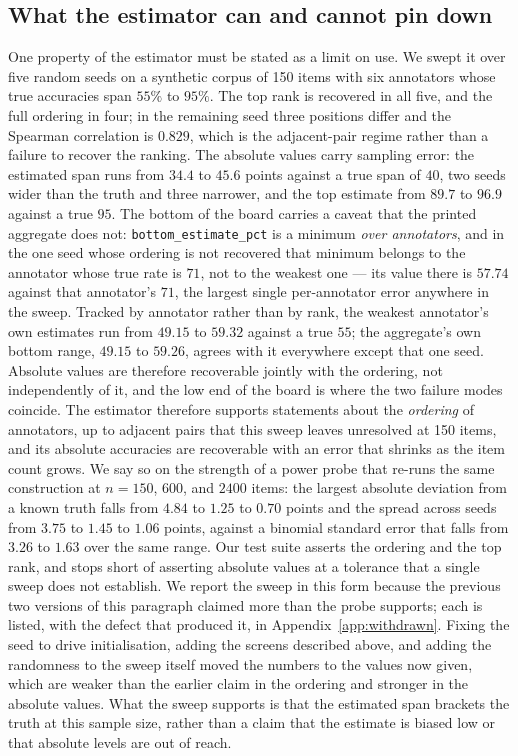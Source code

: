 \documentclass{article}
\begin{document}
\subsection{What the estimator can and cannot pin down}
\label{sec:sweep} One property of the estimator must be stated as a limit on use. We swept it over five random seeds on a synthetic corpus of 150 items with six annotators whose true accuracies span $55\%$ to $95\%$. The top rank is recovered in all five, and the full ordering in four; in the remaining seed three positions differ and the Spearman correlation is $0.829$, which is the adjacent-pair regime rather than a failure to recover the ranking. The absolute values carry sampling error: the estimated span runs from $34.4$ to $45.6$ points against a true span of $40$, two seeds wider than the truth and three narrower, and the top estimate from $89.7$ to $96.9$ against a true $95$. The bottom of the board carries a caveat that the printed aggregate does not: \texttt{bottom\_estimate\_pct} is a minimum \emph{over annotators}, and in the one seed whose ordering is not recovered that minimum belongs to the annotator whose true rate is $71$, not to the weakest one --- its value there is $57.74$ against that annotator's $71$, the largest single per-annotator error anywhere in the sweep. Tracked by annotator rather than by rank, the weakest annotator's own estimates run from $49.15$ to $59.32$ against a true $55$; the aggregate's own bottom range, $49.15$ to $59.26$, agrees with it everywhere except that one seed. Absolute values are therefore recoverable jointly with the ordering, not independently of it, and the low end of the board is where the two failure modes coincide. The estimator therefore supports statements about the
\emph{ordering} of annotators, up to adjacent pairs that this sweep leaves unresolved at 150 items, and its absolute accuracies are recoverable with an error that shrinks as the item count grows. We say so on the strength of a power probe that re-runs the same construction at $n=150$, $600$, and $2400$ items: the largest absolute deviation from a known truth falls from $4.84$ to $1.25$ to $0.70$ points and the spread across seeds from $3.75$ to $1.45$ to $1.06$ points, against a binomial standard error that falls from $3.26$ to $1.63$ over the same range. Our test suite asserts the ordering and the top rank, and stops short of asserting absolute values at a tolerance that a single sweep does not establish. We report the sweep in this form because the previous two versions of this paragraph claimed more than the probe supports; each is listed, with the defect that produced it, in Appendix~\ref{app:withdrawn}. Fixing the seed to drive initialisation, adding the screens described above, and adding the randomness to the sweep itself moved the numbers to the values now given, which are weaker than the earlier claim in the ordering and stronger in the absolute values. What the sweep supports is that the estimated span brackets the truth at this sample size, rather than a claim that the estimate is biased low or that absolute levels are out of reach.
\end{document}
